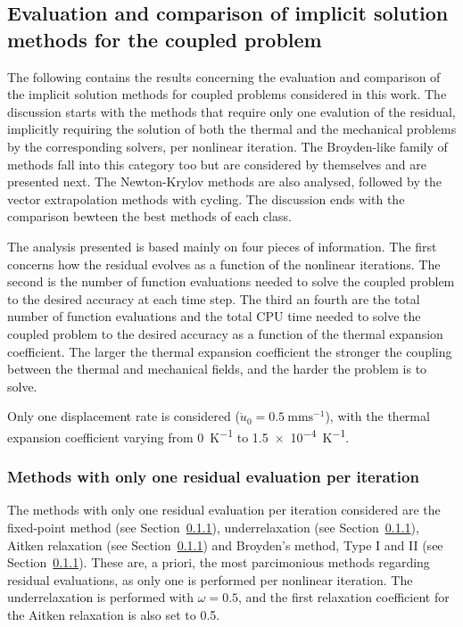 \subsection{Evaluation and comparison of implicit solution methods for the coupled problem}

The following contains the results concerning the evaluation and comparison of the implicit solution methods for coupled problems considered in this work.
The discussion starts with the methods that require only one evalution of the residual, implicitly requiring the solution of both the thermal and the mechanical problems by the corresponding solvers, per nonlinear iteration.
The Broyden-like family of methods fall into this category too but are considered by themselves and are presented next.
The Newton-Krylov methods are also analysed, followed by the vector extrapolation methods with cycling.
The discussion ends with the comparison bewteen the best methods of each class.

The analysis presented is based mainly on four pieces of information.
The first concerns how the residual evolves as a function of the nonlinear iterations.
The second is the number of function evaluations needed to solve the coupled problem to the desired accuracy at each time step.
The third an fourth are the total number of function evaluations and the total CPU time needed to solve the coupled problem to the desired accuracy as a function of the thermal expansion coefficient.
The larger the thermal expansion coefficient the stronger the coupling between the thermal and mechanical fields, and the harder the problem is to solve.

Only one displacement rate is considered (\(\dot u_0 = \SI{0.5}{\milli\meter\second^{-1}}\)), with the thermal expansion coefficient varying from \SI{0}{\kelvin^{-1}} to \SI{1.5e-4}{\kelvin^{-1}}.

\subsubsection{Methods with only one residual evaluation per iteration}

The methods with only one residual evaluation per iteration considered are the fixed-point method (see Section~\ref{}), underrelaxation (see Section~\ref{}), Aitken relaxation (see Section~\ref{}) and Broyden's method, Type I and II (see Section~\ref{}).
These are, a priori, the most parcimonious methods regarding residual evaluations, as only one is performed per nonlinear iteration.
The underrelaxation is performed with \(\omega = 0.5\), and the first relaxation coefficient for the Aitken relaxation is also set to 0.5.

